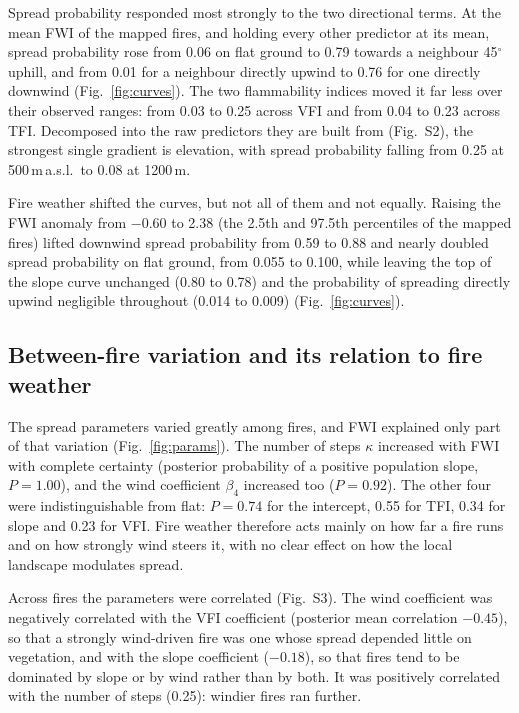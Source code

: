 \documentclass[ResearchPaper,linenum]{CSIRO_LaTeX_Template}
\begin{document}
Spread probability responded most strongly to the two directional terms. At the mean
FWI of the mapped fires, and holding every other predictor at its mean, spread
probability rose from 0.06 on flat ground to 0.79 towards a neighbour 45$^\circ$ uphill,
and from 0.01 for a neighbour directly upwind to 0.76 for one directly downwind
(Fig.~\ref{fig:curves}). The two flammability indices moved it far less over their
observed ranges: from 0.03 to 0.25 across VFI and from 0.04 to 0.23 across TFI.
Decomposed into the raw predictors they are built from (Fig.~S2), the strongest single gradient is
elevation, with spread probability falling from 0.25 at 500\,m\,a.s.l.\ to 0.08 at
1200\,m.

Fire weather shifted the curves, but not all of them and not equally. Raising the FWI
anomaly from $-0.60$ to 2.38 (the 2.5th and 97.5th percentiles of the mapped fires)
lifted downwind spread probability from 0.59 to 0.88 and nearly doubled spread
probability on flat ground, from 0.055 to 0.100, while leaving the top of the slope
curve unchanged (0.80 to 0.78) and the probability of spreading directly upwind
negligible throughout (0.014 to 0.009) (Fig.~\ref{fig:curves}).

\subsection{Between-fire variation and its relation to fire weather}

The spread parameters varied greatly among fires, and FWI explained only part of that
variation (Fig.~\ref{fig:params}). The number of steps $\kappa$ increased with FWI with
complete certainty (posterior probability of a positive population slope, $P = 1.00$),
and the wind coefficient $\beta_4$ increased too ($P = 0.92$). The other four were
indistinguishable from flat: $P = 0.74$ for the intercept, 0.55 for TFI, 0.34 for slope
and 0.23 for VFI. Fire weather therefore acts mainly on how far a fire runs and on how
strongly wind steers it, with no clear effect on how the local landscape modulates spread.

Across fires the parameters were correlated (Fig.~S3). The wind coefficient was
negatively correlated with the VFI coefficient (posterior mean correlation $-0.45$),
so that a strongly wind-driven fire was one whose spread depended little on vegetation,
and with the slope coefficient ($-0.18$), so that fires tend to be dominated by slope or
by wind rather than by both. It was positively correlated with the number of steps
(0.25): windier fires ran further.
\end{document}
